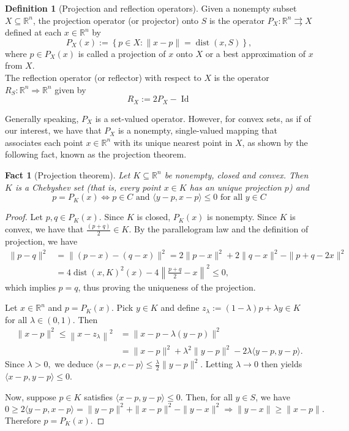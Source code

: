 \documentclass[smallextended,numbook,nospthms]{svjour3}
\theoremstyle{plain}
\newtheorem{fact}[theorem]{Fact}
\theoremstyle{definition}
\newtheorem{definition}[theorem]{Definition}
\def\RR{\mathds R}
\DeclareMathOperator{\dist}{dist}
\begin{document}
\begin{definition}[Projection and reflection operators]{\label{def:proj}}
	Given a nonempty subset $X \subseteq \RR^n$, the projection operator (or projector) onto $S$ is the operator $P_{X}: \RR^n \rightrightarrows X$ defined at each $x \in \RR^n$ by
	\[
	P_{X}(x):=\left\{p \in X:\|x-p\|=\dist(x,S)\right\},
	\]
	where $p \in P_{X}(x)$ is called a projection of $x$ onto $X$ or a best approximation of $x$ from $X$.\\
	The reflection operator (or reflector) with respect to $X$ is the operator $R_{S}: \RR^n \Rightarrow \RR^n$ given by
	\[
	R_{X}:=2P_{X}-\operatorname{Id}
	\]
\end{definition}

Generally speaking, $P_{X}$ is a set-valued operator.
However, for convex sets, as if of our interest, we have that $P_{X}$ is a nonempty, single-valued mapping that associates each point $x \in \RR^n$ with its unique nearest point in $X$, as shown by the following fact, known as the projection theorem.

\begin{fact}[Projection theorem]\label{fact:proj thm}
	Let $K \subseteq \RR^{n}$ be nonempty, closed and convex. Then $K$ is a Chebyshev set (that is, every point $x \in K$ has an unique projection $p$) and
	\begin{equation}
		p=P_{K}(x) \iff p \in C \text { and }\langle y-p, x-p\rangle \leq 0 \text { for all } y \in C
	\end{equation}
\end{fact}
\begin{proof}
	Let $p, q \in P_{K}(x)$. Since $K$ is closed, $P_{K}(x)$ is nonempty. Since $K$ is convex, we have that $\frac{(p+q)}{2} \in K$. By the parallelogram law and the definition of projection, we have
	\[
	\begin{aligned}
		\|p-q\|^{2} &=\|(p-x)-(q-x)\|^{2} = 2\|p-x\|^{2}+2\|q-x\|^{2}-\|p+q-2 x\|^{2} \\
		&=4 \dist(x,K)^{2}(x)-4\left\|\frac{p+q}{2}-x\right\|^{2} \leq 0,
	\end{aligned}
	\]
	which implies $p=q$, thus proving the uniqueness of the projection. 
	
	Let $x \in \RR^n$ and $p=P_{K}(x)$. Pick $y \in K$ and define $z_{\lambda}:=(1-\lambda) p+\lambda y \in K$ for all $\lambda \in (0,1)$. Then
	\begin{align}
		\|x-p\|^{2} \leq\left\|x-z_{\lambda}\right\|^{2} &=\|x-p-\lambda(y-p)\|^{2} \\
		&=\|x-p\|^{2}+\lambda^{2}\|y-p\|^{2}-2 \lambda\langle y-p, y-p\rangle.
	\end{align}
	Since $\lambda>0,$ we deduce $\langle s-p, c-p\rangle \leq \frac{\lambda}{2}\|y-p\|^{2}$. Letting $\lambda \rightarrow 0$ then yields $\langle x-p, y-p\rangle \leq 0$.
	
	Now, suppose $p \in K$ satisfies
	$\langle x-p, y-p\rangle \leq 0$. Then, for all $y \in S$, we have
	\[
	0 \geq 2\langle y-p, x-p\rangle=\|y-p\|^{2}+\|x-p\|^{2}-\|y-x\|^{2} \Longrightarrow\|y-x\| \geq\|x-p\|.
	\]
	Therefore $p=P_{K}(x)$.
\end{proof}
\end{document}
